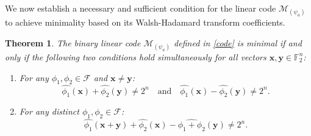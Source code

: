 \documentclass[10pt,a4paper]{amsart}
\newtheorem{theorem}{Theorem}%
\begin{document}
We now establish a necessary and sufficient condition for the linear code $\mathcal{M}_{(\psi_a)}$ to achieve minimality based on its Walsh-Hadamard transform coefficients.
\begin{theorem}\label{Thm_Minimal_Cond}
The binary linear code $\mathcal{M}_{(\psi_a)}$ defined in \eqref{code} is minimal if and only if the following two conditions hold simultaneously for all vectors $\mathbf{x},\mathbf{y} \in \mathbb{F}_2^n$:
\begin{enumerate}
    \item For any $\phi_1,\phi_2 \in \mathcal{F}$ and $\mathbf{x} \neq \mathbf{y}$:
    \[ \widehat{\phi_1}(\mathbf{x})+\widehat{\phi_2}(\mathbf{y})\neq 2^n \quad \text{and} \quad \widehat{\phi_1}(\mathbf{x})-\widehat{\phi_2}(\mathbf{y})\neq 2^n. \tag{2.3} \]
    \item For any distinct $\phi_1,\phi_2 \in \mathcal{F}$:
    \[ \widehat{\phi_1}(\mathbf{x}+\mathbf{y})+\widehat{\phi_2}(\mathbf{x})-\widehat{\phi_1+\phi_2}(\mathbf{y})\neq 2^n. \tag{2.4} \]
\end{enumerate}
\end{theorem}
\end{document}
